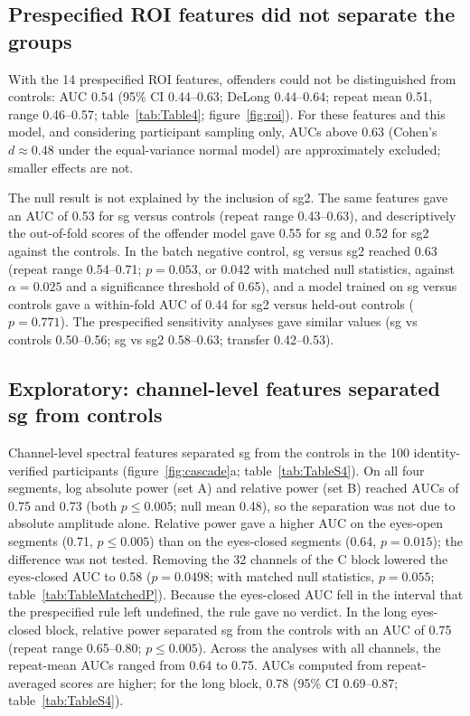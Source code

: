 \subsection{Prespecified ROI features did not separate the groups}
\label{sec:res-roi}

With the 14 prespecified ROI features, offenders could not be distinguished from controls: AUC 0.54 (95\% CI 0.44--0.63; DeLong 0.44--0.64; repeat mean 0.51, range 0.46--0.57; table~\ref{tab:Table4}; figure~\ref{fig:roi}). For these features and this model, and considering participant sampling only, AUCs above 0.63 (Cohen's $d \approx 0.48$ under the equal-variance normal model) are approximately excluded; smaller effects are not.

The null result is not explained by the inclusion of sg2. The same features gave an AUC of 0.53 for sg versus controls (repeat range 0.43--0.63), and descriptively the out-of-fold scores of the offender model gave 0.55 for sg and 0.52 for sg2 against the controls. In the batch negative control, sg versus sg2 reached 0.63 (repeat range 0.54--0.71; $p = 0.053$, or 0.042 with matched null statistics, against $\alpha = 0.025$ and a significance threshold of 0.65), and a model trained on sg versus controls gave a within-fold AUC of 0.44 for sg2 versus held-out controls ($p = 0.771$). The prespecified sensitivity analyses gave similar values (sg vs controls 0.50--0.56; sg vs sg2 0.58--0.63; transfer 0.42--0.53).

\subsection{Exploratory: channel-level features separated sg from controls}
\label{sec:res-channel}

Channel-level spectral features separated sg from the controls in the 100 identity-verified participants (figure~\ref{fig:cascade}a; table~\ref{tab:TableS4}). On all four segments, log absolute power (set A) and relative power (set B) reached AUCs of 0.75 and 0.73 (both $p \le 0.005$; null mean 0.48), so the separation was not due to absolute amplitude alone. Relative power gave a higher AUC on the eyes-open segments (0.71, $p \le 0.005$) than on the eyes-closed segments (0.64, $p = 0.015$); the difference was not tested. Removing the 32 channels of the C block lowered the eyes-closed AUC to 0.58 ($p = 0.0498$; with matched null statistics, $p = 0.055$; table~\ref{tab:TableMatchedP}). Because the eyes-closed AUC fell in the interval that the prespecified rule left undefined, the rule gave no verdict. In the long eyes-closed block, relative power separated sg from the controls with an AUC of 0.75 (repeat range 0.65--0.80; $p \le 0.005$). Across the analyses with all channels, the repeat-mean AUCs ranged from 0.64 to 0.75. AUCs computed from repeat-averaged scores are higher; for the long block, 0.78 (95\% CI 0.69--0.87; table~\ref{tab:TableS4}).

